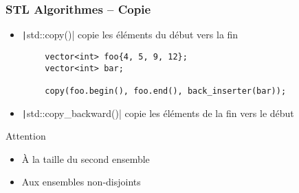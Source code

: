 \documentclass[C++.tex]{subfiles}
\begin{document}
\begin{frame}[fragile]
	\frametitle{STL Algorithmes -- Copie}
	\begin{itemize}
		\item \texttt|std::copy()| copie les éléments du début vers la fin
	\end{itemize}

	\begin{verbatim}
		vector<int> foo{4, 5, 9, 12};
		vector<int> bar;

		copy(foo.begin(), foo.end(), back_inserter(bar));
	\end{verbatim}

	\begin{itemize}
		\item \texttt|std::copy_backward()| copie les éléments de la fin vers le début
	\end{itemize}

	\begin{alertblock}{Attention}
		\begin{itemize}
			\item À la taille du second ensemble
			\item Aux ensembles non-disjoints
		\end{itemize}
	\end{alertblock}

\end{frame}
\end{document}
